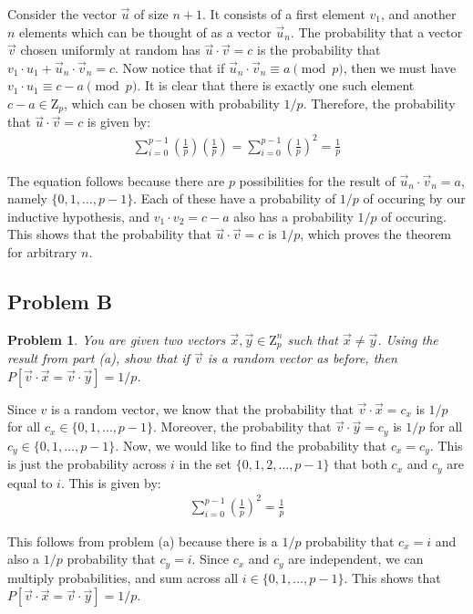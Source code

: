 \documentclass[psamsfonts]{amsart}
\newtheorem{prob}{Problem}[section]
\newenvironment{sol}{{\bfseries Solution}}{\qedsymbol}
\theoremstyle{definition}
\theoremstyle{remark}
\numberwithin{equation}{section}
\begin{document}
\begin{sol}
Consider the vector $\vec{u}$ of size $n+1$. It consists of a first element $v_1$, and another $n$ elements which can be thought of as a vector $\vec{u}_n$. The probability that a vector $\vec{v}$ chosen uniformly at random has $\vec{u} \cdot \vec{v} = c$ is the probability that $v_1 \cdot u_1 + \vec{u}_n \cdot \vec{v}_n = c$. Now notice that if $\vec{u}_n \cdot \vec{v}_n \equiv a \pmod{p}$, then we must have $v_1 \cdot u_1 \equiv c - a \pmod{p}$. It is clear that there is exactly one such element $c - a \in \mathrm{Z}_p$, which can be chosen with probability $1/p$. Therefore, the probability that $\vec{u} \cdot \vec{v} = c$ is given by:
\begin{eqnarray}
\sum_{i=0}^{p-1} \left( \frac{1}{p} \right)  \left( \frac{1}{p} \right) = \sum_{i=0}^{p-1} \left( \frac{1}{p} \right)^2 = \frac{1}{p}  
\end{eqnarray} 

The equation follows because there are $p$ possibilities for the result of $\vec{u}_n \cdot \vec{v}_n = a$, namely $\{0,1,\ldots, p-1\}$. Each of these have a probability of $1/p$ of occuring by our inductive hypothesis, and $v_1 \cdot v_2 = c - a$ also has a probability $1/p$ of occuring. This shows that the probability that $\vec{u} \cdot \vec{v} = c$ is $1/p$, which proves the theorem for arbitrary $n$.
\end{sol}

\subsection{Problem B}

\begin{prob}
You are given two vectors $\vec{x}, \vec{y} \in \mathrm{Z}_p^n$ such that $\vec{x} \neq \vec{y}$. Using the result from part (a), show that if $\vec{v}$ is a random vector as before, then $P[\vec{v} \cdot \vec{x} = \vec{v} \cdot \vec{y}] = 1/p$. 
\end{prob}

\begin{sol}
Since $v$ is a random vector, we know that the probability that $\vec{v} \cdot \vec{x} = c_x$ is $1/p$ for all $c_x \in \{0,1,\ldots, p-1\}$. Moreover, the probability that $\vec{v} \cdot \vec{y} = c_y$ is $1/p$ for all $c_y \in \{0,1,\ldots, p-1\}$. Now, we would like to find the probability that $c_x = c_y$. This is just the probability across $i$ in the set $\{0,1,2,\ldots, p-1\}$ that both $c_x$ and $c_y$ are equal to $i$. This is given by:
\begin{eqnarray}
\sum_{i=0}^{p-1} \left( \frac{1}{p} \right)^2 = \frac{1}{p}
\end{eqnarray}

This follows from problem (a) because there is a $1/p$ probability that $c_x = i$ and also a $1/p$ probability that $c_y = i$. Since $c_x$ and $c_y$ are independent, we can multiply probabilities, and sum across all $i \in \{0,1,\ldots, p-1 \}$. This shows that $P[\vec{v} \cdot \vec{x} = \vec{v} \cdot \vec{y}] = 1/p$. 
\end{sol}
\end{document}
